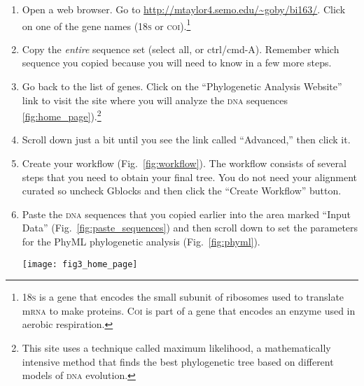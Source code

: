 \documentclass[12pt, hidelinks]{exam}
\newcommand{\dna}{\textsc{dna}}
\begin{document}
\begin{enumerate}

	\item Open a web browser. Go to \url{http://mtaylor4.semo.edu/~goby/bi163/}. Click on one of the gene names (18\textsc{s} or \textsc{coi}).\footnote{18\textsc{s} is a gene that encodes the small subunit of ribosomes used to translate m\textsc{rna} to make proteins. C\textsc{oi} is part of a gene that encodes an enzyme used in aerobic respiration.}%
	
	\item Copy the \emph{entire} sequence set (select all, or ctrl/cmd-A). Remember which sequence you copied because you will need to know in a few more steps.
	

	\item Go back to the list of genes. Click on the “Phylogenetic Analysis Website” link to visit the site where you will analyze the \dna{} sequences \ref{fig:home_page}).\footnote{This site uses a technique called maximum likelihood, a mathematically intensive method that finds the best phylogenetic tree based on different models of \dna{} evolution.} 

  	\item Scroll down just a bit until you see the link called “Advanced,” then click it.

	\item Create your workflow (Fig.~\ref{fig:workflow}). The workflow consists of several steps
that you need to obtain your final tree. You do not need your alignment curated so uncheck Gblocks and
then click the “Create Workflow” button.

	\item Paste the \textsc{dna} sequences that you copied earlier into the area
marked “Input Data” (Fig.~\ref{fig:paste_sequences}) and then scroll down to set the
parameters for the PhyML phylogenetic analysis (Fig.~\ref{fig:phyml}).

\begin{center}
	\texttt{[image: fig3\_home\_page]}
\end{center}


\end{enumerate}
\end{document}
